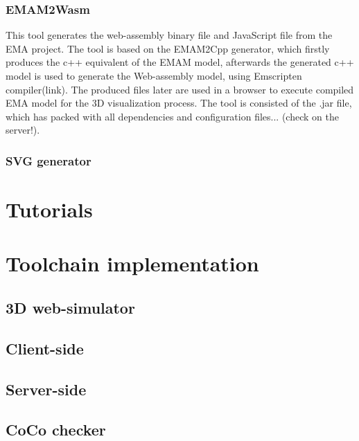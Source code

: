 \subsection{EMAM2Wasm} \label{sec:emam2wasm}
This tool generates the web-assembly binary file and JavaScript file from the EMA project. The tool is based on the EMAM2Cpp generator, which firstly produces the c++ equivalent of the EMAM model, afterwards the generated c++ model is used to generate the Web-assembly model, using Emscripten compiler(link). The produced files later are used in a browser to execute compiled EMA model for the 3D visualization process.
The tool is consisted of the .jar file, which has packed with all dependencies and configuration files... (check on the server!).
\subsection{SVG generator} \label{sec:svggen}

\chapter{Tutorials}
\chapter{Toolchain implementation}
\section{3D web-simulator}
\section{Client-side}
\section{Server-side}
\section{CoCo checker}
